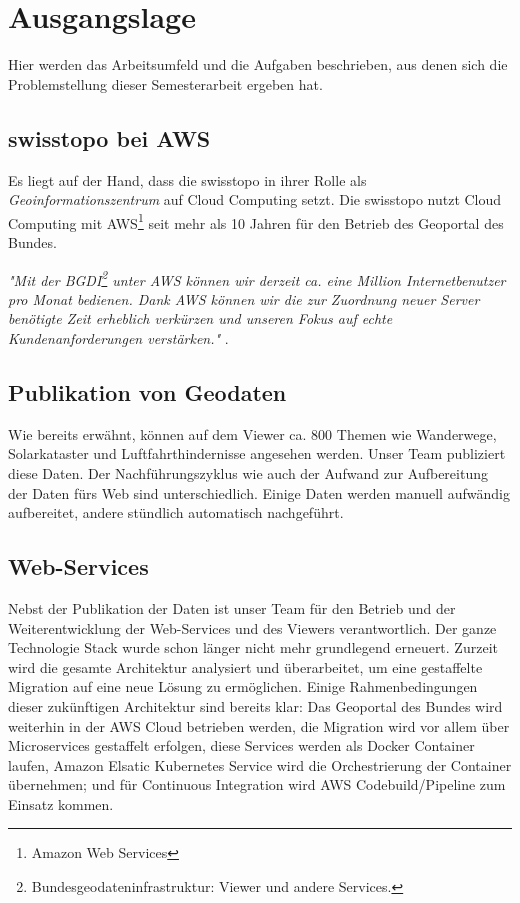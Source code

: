 \section{Ausgangslage}
Hier werden das Arbeitsumfeld und die Aufgaben beschrieben, aus denen sich die Problemstellung dieser Semesterarbeit ergeben hat.

\subsection{swisstopo bei AWS}
Es liegt auf der Hand, dass die swisstopo in ihrer Rolle als \emph{Geoinformationszentrum} auf Cloud Computing setzt. Die swisstopo nutzt Cloud Computing mit AWS\footnote{Amazon Web Services} seit mehr als 10 Jahren für den Betrieb des Geoportal des Bundes.
 
\textit{"Mit der BGDI\footnote{Bundesgeodateninfrastruktur: Viewer und andere Services.} unter AWS können wir derzeit ca. eine Million Internetbenutzer pro Monat bedienen. Dank AWS können wir die zur Zuordnung neuer Server benötigte Zeit erheblich verkürzen und unseren Fokus auf echte Kundenanforderungen verstärken."} \cite{Christ2020}.


\subsection{Publikation von Geodaten}
Wie bereits erwähnt, können auf dem Viewer ca. 800 Themen wie Wanderwege, Solarkataster und Luftfahrthindernisse angesehen werden. Unser Team publiziert diese Daten. Der Nachführungszyklus wie auch der Aufwand zur
Aufbereitung der Daten fürs Web sind unterschiedlich. Einige Daten werden manuell aufwändig aufbereitet, andere
stündlich automatisch nachgeführt.

\subsection{Web-Services}
Nebst der Publikation der Daten ist unser Team für den Betrieb und der Weiterentwicklung der Web-Services
und des Viewers verantwortlich. Der ganze Technologie Stack wurde schon länger nicht mehr grundlegend erneuert. Zurzeit wird
die gesamte Architektur analysiert und überarbeitet, um eine gestaffelte Migration auf eine neue
Lösung zu ermöglichen.
Einige Rahmenbedingungen dieser zukünftigen Architektur sind bereits klar: Das Geoportal des
Bundes wird weiterhin in der AWS Cloud betrieben werden, die Migration wird vor allem über
Microservices gestaffelt erfolgen, diese Services werden als Docker Container laufen, Amazon
Elsatic Kubernetes Service wird die Orchestrierung der Container übernehmen; und für Continuous
Integration wird AWS Codebuild/Pipeline zum Einsatz kommen.

